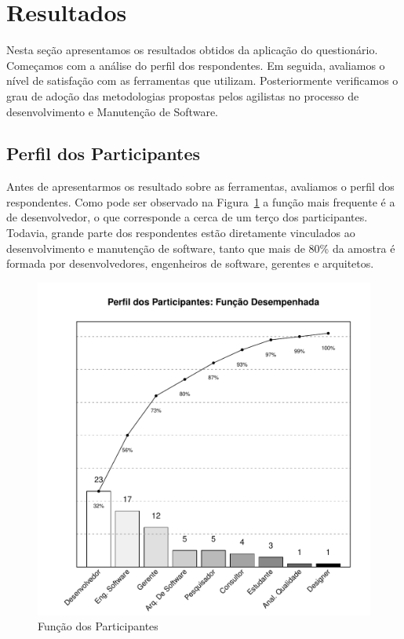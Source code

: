 
\section{Resultados}
\label{sec:analise_dados}

Nesta seção apresentamos os resultados obtidos da aplicação do questionário.
Começamos com a análise do perfil dos respondentes. Em seguida, avaliamos o
nível de satisfação com as ferramentas que utilizam. Posteriormente verificamos
o grau de adoção das metodologias propostas pelos agilistas no processo de
desenvolvimento e Manutenção de Software.

\subsection{Perfil dos Participantes}
\label{sub:pesquisa_prof_perfil_dos_participantes}

Antes de apresentarmos os resultado sobre as ferramentas, avaliamos o perfil dos
respondentes. Como pode ser observado na
Figura~\ref{fig:grafico_melhorias_fgrm_funcao_particantes} a função mais
frequente é a de desenvolvedor, o que corresponde a cerca de um terço dos
participantes. Todavia, grande parte dos respondentes estão diretamente
vinculados ao desenvolvimento e manutenção de software, tanto que mais de 80\%
da amostra é formada por desenvolvedores, engenheiros de software, gerentes e
arquitetos.

\begin{figure}[htpb]
	\centering
	\includegraphics[width=0.6\linewidth]{./chapter-pesquisa-com-profissionais/img/grafico_melhoria_fgrm_funcao_participantes.pdf}
	\caption{Função dos Participantes}
\label{fig:grafico_melhorias_fgrm_funcao_particantes}
\end{figure}

